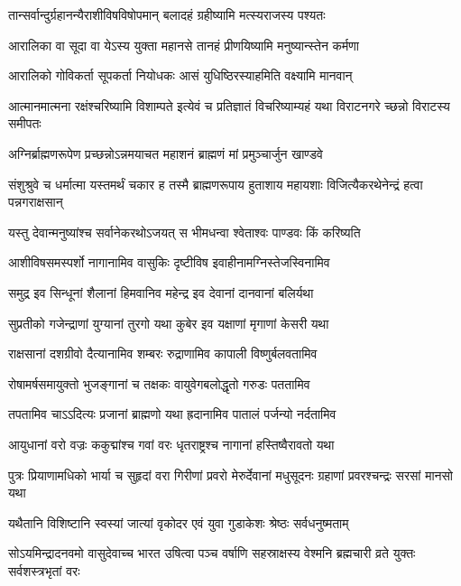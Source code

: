 \twolineshloka
{तान्सर्वान्दुर्ग्रहानन्यैराशीविषविषोपमान्}
{बलादहं ग्रहीष्यामि मत्स्यराजस्य पश्यतः}


\twolineshloka
{आरालिका वा सूदा वा येऽस्य युक्ता महानसे}
{तानहं प्रीणयिष्यामि मनुष्यान्स्तेन कर्मणा}


\twolineshloka
{आरालिको गोविकर्ता सूपकर्ता नियोधकः}
{आसं युधिष्ठिरस्याहमिति वक्ष्यामि मानवान्}


\threelineshloka
{आत्मानमात्मना रक्षंश्चरिष्यामि विशाम्पते}
{इत्येवं च प्रतिज्ञातं विचरिष्याम्यहं यथा}
{विराटनगरे च्छन्नो विराटस्य समीपतः}




\twolineshloka
{अग्निर्ब्राह्मणरूपेण प्रच्छन्नोऽन्नमयाचत}
{महाशनं ब्राह्मणं मां प्रमुञ्चार्जुन खाण्डवे}


\threelineshloka
{संशुश्रुवे च धर्मात्मा यस्तमर्थं चकार ह}
{तस्मै ब्राह्मणरूपाय हुताशाय महायशाः}
{विजित्यैकरथेनेन्द्रं हत्वा पन्नगराक्षसान्}


\twolineshloka
{यस्तु देवान्मनुष्यांश्च सर्वानेकरथोऽजयत्}
{स भीमधन्वा श्वेताश्वः पाण्डवः किं करिष्यति}


\twolineshloka
{आशीविषसमस्पर्शो नागानामिव वासुकिः}
{दृष्टीविष इवाहीनामग्निस्तेजस्विनामिव}


\twolineshloka
{समुद्र इव सिन्धूनां शैलानां हिमवानिव}
{महेन्द्र इव देवानां दानवानां बलिर्यथा}


\twolineshloka
{सुप्रतीको गजेन्द्राणां युग्यानां तुरगो यथा}
{कुबेर इव यक्षाणां मृगाणां केसरी यथा}


\twolineshloka
{राक्षसानां दशग्रीवो दैत्यानामिव शम्बरः}
{रुद्राणामिव कापाली विष्णुर्बलवतामिव}


\twolineshloka
{रोषामर्षसमायुक्तो भुजङ्गानां च तक्षकः}
{वायुवेगबलोद्धृतो गरुडः पततामिव}


\twolineshloka
{तपतामिव चाऽऽदित्यः प्रजानां ब्राह्मणो यथा}
{ह्रदानामिव पातालं पर्जन्यो नर्दतामिव}


\twolineshloka
{आयुधानां वरो वज्रः ककुद्मांश्च गवां वरः}
{धृतराष्ट्रश्च नागानां हस्तिष्वैरावतो यथा}


\threelineshloka
{पुत्रः प्रियाणामधिको भार्या च सुहृदां वरा}
{गिरीणां प्रवरो मेरुर्देवानां मधुसूदनः}
{ग्रहाणां प्रवरश्चन्द्रः सरसां मानसो यथा}


\twolineshloka
{यथैतानि विशिष्टानि स्वस्यां जात्यां वृकोदर}
{एवं युवा गुडाकेशः श्रेष्ठः सर्वधनुष्मताम्}


\threelineshloka
{सोऽयमिन्द्रादनवमो वासुदेवाच्च भारत}
{उषित्वा पञ्च वर्षाणि सहस्राक्षस्य वेश्मनि}
{ब्रह्मचारी व्रते युक्तः सर्वशस्त्रभृतां वरः}


